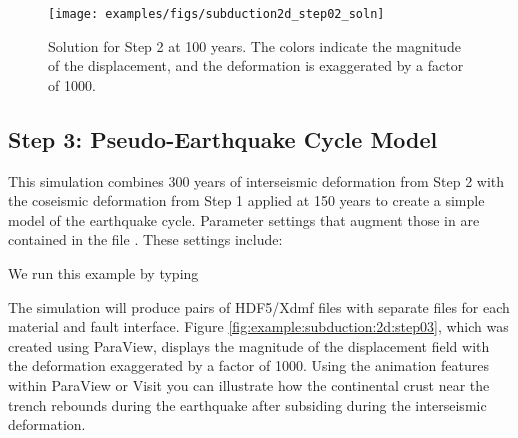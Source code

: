 \begin{figure}
  \texttt{[image: examples/figs/subduction2d\_step02\_soln]}
  \caption{Solution for Step 2 at 100 years. The colors indicate the
    magnitude of the displacement, and the deformation is exaggerated
    by a factor of 1000.}
  \label{fig:example:subduction:2d:step02}
\end{figure}


\subsection{Step 3: Pseudo-Earthquake Cycle Model}

This simulation combines 300 years of interseismic deformation from
Step 2 with the coseismic deformation from Step 1 applied at 150 years
to create a simple model of the earthquake cycle. Parameter settings
that augment those in  are contained in the
file . These settings include:
\begin{inventory}
\end{inventory}
We run this example by typing
The simulation will produce pairs of HDF5/Xdmf files with separate
files for each material and fault interface. Figure \vref{fig:example:subduction:2d:step03},
which was created using ParaView, displays the magnitude of the displacement
field with the deformation exaggerated by a factor of 1000. Using
the animation features within ParaView or Visit you can illustrate
how the continental crust near the trench rebounds during the earthquake
after subsiding during the interseismic deformation. 

